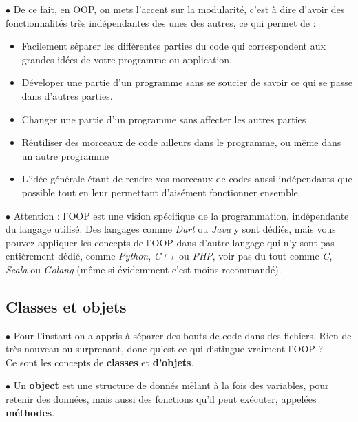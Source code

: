 \par $\bullet$ De ce fait, en OOP, on mets l'accent sur la modularité, c'est à dire d'avoir des fonctionnalités très indépendantes des unes des autres, ce qui permet de  :
\begin{itemize}
  \item Facilement séparer les différentes parties du code qui correspondent aux grandes idées de votre programme ou application.

  \item Déveloper une partie d'un programme sans se soucier de savoir ce qui se passe dans d'autres parties.

  \item Changer une partie d'un programme sans affecter les autres parties

  \item Réutiliser des morceaux de code ailleurs dans le programme, ou même dans un autre programme

  \item L'idée générale étant de rendre vos morceaux de codes aussi indépendants que possible tout en leur permettant d'aisément fonctionner ensemble.

\end{itemize}

\par $\bullet$ Attention : l'OOP est une vision spécifique de la programmation, indépendante du langage utilisé. Des langages comme \textit{Dart} ou \textit{Java} y sont dédiés, mais vous pouvez appliquer les concepts de l'OOP dans d'autre langage qui n'y sont pas entièrement dédié, comme \textit{Python}, \textit{C++} ou \textit{PHP}, voir pas du tout comme \textit{C}, \textit{Scala} ou \textit{Golang} (même si évidemment c'est moins recommandé).

\subsection{Classes et objets}

\par $\bullet$ Pour l'instant on a appris à séparer des bouts de code dans des fichiers. Rien de très nouveau ou surprenant, donc qu'est-ce qui distingue vraiment l'OOP ? \\

Ce sont les concepts de \textbf{classes} et \textbf{d'objets}. \\

\par $\bullet$ Un \textbf{object} est une structure de donnés mêlant à la fois des variables, pour retenir des données, mais aussi des fonctions qu'il peut exécuter, appelées \textbf{méthodes}.

